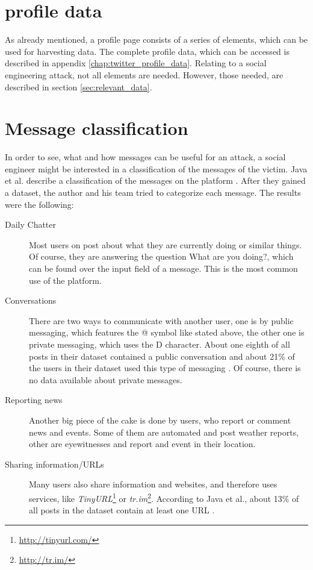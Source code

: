 \section{\Twitter{} profile data}
\label{sec:twitter_profile_data}

As already mentioned, a \Twitter{} profile page consists of a series of
elements, which can be used for harvesting data. The complete profile data,
which can be accessed is described in appendix
\ref{chap:twitter_profile_data}. Relating to a social engineering attack,
not all elements are needed. However, those needed, are described in section
\ref{sec:relevant_data}.

\section{Message classification}

In order to see, what and how messages can be useful for an attack, a social
engineer might be interested in a classification of the messages of the victim.
Java et al. describe a classification of the messages on the \Twitter{}
platform \cite{java2007}. After they gained a dataset, the author and his team
tried to categorize each message. The results were the following:

\begin{description}

\item[Daily Chatter]
Most users on \Twitter{} post about what they are currently doing or similar
things. Of course, they are answering the question \flqq{}What are you
doing?\frqq{}, which can be found over the input field of a message. This is
the most common use of the \Twitter{} platform.

\item[Conversations]
There are two ways to communicate with another user, one is by public
messaging, which features the @ symbol like stated above, the other one is
private messaging, which uses the D character. About one eighth of all posts
in their dataset contained a public conversation and about 21\% of the users in
their dataset used this type of messaging \cite{java2007}. Of course, there is
no data available about private messages.

\item[Reporting news]
Another big piece of the cake is done by users, who report or comment news and
events. Some of them are automated and post weather reports, other are
eyewitnesses and report and event in their location.

\item[Sharing information/URLs]
Many users also share information and websites, and therefore uses services,
like \textit{TinyURL}\footnote{\url{http://tinyurl.com/}} or
\textit{tr.im}\footnote{\url{http://tr.im/}}. According to Java et al.,
about 13\% of all posts in the dataset contain at least one URL \cite{java2007}.

\end{description}


